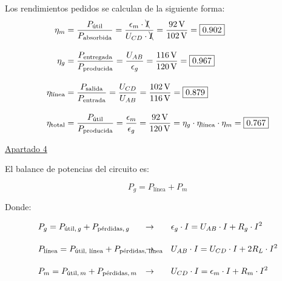\begin{example}
\vspace{5mm}

Los rendimientos pedidos se calculan de la siguiente forma:
\begin{align*}
    \eta_m &= \frac{P_{\textrm{útil}}}{P_{\textrm{absorbida}}} = \frac{\epsilon_m \cdot \bcancel{I}}{U_{CD} \cdot \bcancel{I}} = \frac{\qty{92}{\volt}}{\qty{102}{\volt}}  = \boxed{0.902}\\[10pt]
    \eta_g &= \frac{P_{\textrm{entregada}}}{P_{\textrm{producida}}} = \frac{U_{AB}}{\epsilon_g} = \frac{\qty{116}{\volt}}{\qty{120}{\volt}} = \boxed{0.967}\\[10pt]
    \eta_{\textrm{línea}} &= \frac{P_{\textrm{salida}}}{P_{\textrm{entrada}}} = \frac{U_{CD}}{U_{AB}} = \frac{\qty{102}{\volt}}{\qty{116}{\volt}} = \boxed{0.879}\\[10pt]
    \eta_{\textrm{total}} &= \frac{P_{\textrm{útil}}}{P_{\textrm{producida}}} = \frac{\epsilon_m}{\epsilon_g} = \frac{\qty{92}{\volt}}{\qty{120}{\volt}} = \eta_g \cdot \eta_{\textrm{línea}} \cdot \eta_m = \boxed{0.767}
\end{align*}

\vspace{2mm}

\underline{Apartado 4}

\vspace{5mm}

El balance de potencias del circuito es:

\[
  P_{g} = P_{\textrm{línea}} + P_{m}
\]

Donde:

\vspace{-3mm}
\begin{align*}
  & P_{g} = P_{\textrm{útil}, \, g} + P_{\textrm{pérdidas}, \, g} & \rightarrow \qquad & \epsilon_g \cdot I = U_{AB} \cdot I + R_g \cdot I^2 \\[10pt]
  & P_{\textrm{línea}} = P_{\textrm{útil, línea}} + P_{\textrm{pérdidas, línea}} \hspace{-20mm} & \rightarrow \qquad & U_{AB} \cdot I = U_{CD} \cdot I + 2 R_L \cdot I^2\\[10pt]
  & P_{m} = P_{\textrm{útil}, \, m} + P_{\textrm{pérdidas}, \, m} & \rightarrow \qquad & U_{CD} \cdot I = \epsilon_m \cdot I + R_m \cdot I^2 
\end{align*}
	    
\end{example}



